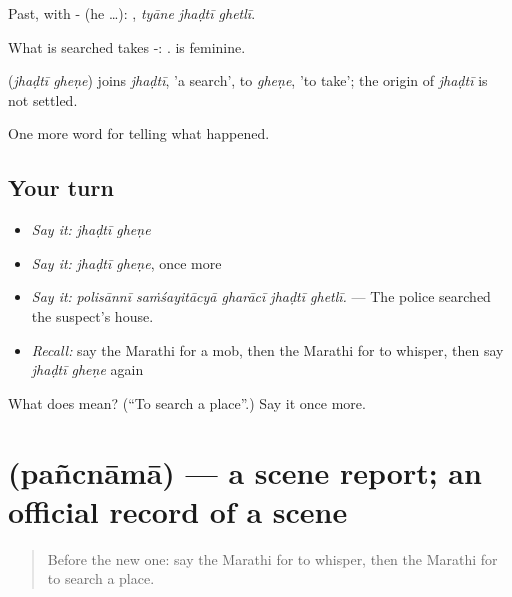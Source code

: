 Past, with - (he …):   , \emph{tyāne jhaḍtī ghetlī}.

What is searched takes -:   .  is feminine.

\begin{cousinweb}
\textbf{ } (\emph{jhaḍtī gheṇe}) joins \emph{jhaḍtī}, 'a search', to \emph{gheṇe}, 'to take'; the origin of \emph{jhaḍtī} is not settled.
\end{cousinweb}

\begin{grammarlens}[title={What you've built}]
One more word for telling what happened.
\end{grammarlens}

\subsection*{Your turn}
\begin{itemize}
\raggedright
  \item \emph{Say it:} \emph{jhaḍtī gheṇe}
  \item \emph{Say it:} \emph{jhaḍtī gheṇe}, once more
  \item \emph{Say it:} \emph{polisānnī saṁśayitācyā gharācī jhaḍtī ghetlī.} — The police searched the suspect's house.
  \item \emph{Recall:} say the Marathi for a mob, then the Marathi for to whisper, then say \emph{jhaḍtī gheṇe} again
\end{itemize}

\begin{tcolorbox}[breakable,colback=teal!4,colframe=teal!35!black,title={Before you move on}]
What does   mean? (\textquotedblleft{}To search a place\textquotedblright{}.) Say it once more.
\end{tcolorbox}
\section[\texorpdfstring{\mr{पंचनामा} (pañcnāmā)}{पंचनामा (pañcnāmā)}]{ (pañcnāmā) — a scene report; an official record of a scene}

\label{lesson:MR-C299-pancnama}



\begin{quote}
Before the new one: say the Marathi for to whisper, then the Marathi for to search a place.
\end{quote}

